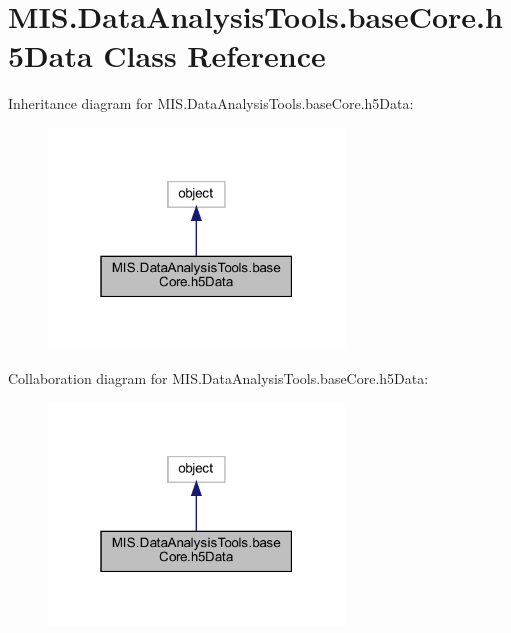 \hypertarget{classMIS_1_1DataAnalysisTools_1_1baseCore_1_1h5Data}{}\section{M\+I\+S.\+Data\+Analysis\+Tools.\+base\+Core.\+h5\+Data Class Reference}
\label{classMIS_1_1DataAnalysisTools_1_1baseCore_1_1h5Data}


Inheritance diagram for M\+I\+S.\+Data\+Analysis\+Tools.\+base\+Core.\+h5\+Data\+:\nopagebreak
\begin{figure}[H]
\begin{center}
\leavevmode
\includegraphics[width=223pt]{classMIS_1_1DataAnalysisTools_1_1baseCore_1_1h5Data__inherit__graph}
\end{center}
\end{figure}


Collaboration diagram for M\+I\+S.\+Data\+Analysis\+Tools.\+base\+Core.\+h5\+Data\+:\nopagebreak
\begin{figure}[H]
\begin{center}
\leavevmode
\includegraphics[width=223pt]{classMIS_1_1DataAnalysisTools_1_1baseCore_1_1h5Data__coll__graph}
\end{center}
\end{figure}
